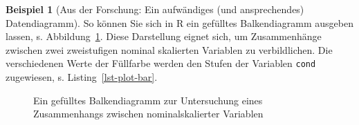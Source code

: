 \documentclass[
  a4paper,
]{scrbook}
\newenvironment{Shaded}{\begin{snugshade}}{\end{snugshade}}
\newcommand{\AttributeTok}[1]{\textcolor[rgb]{0.40,0.45,0.13}{#1}}
\newcommand{\CommentTok}[1]{\textcolor[rgb]{0.37,0.37,0.37}{#1}}
\newcommand{\FunctionTok}[1]{\textcolor[rgb]{0.28,0.35,0.67}{#1}}
\newcommand{\NormalTok}[1]{\textcolor[rgb]{0.00,0.23,0.31}{#1}}
\newcommand{\SpecialCharTok}[1]{\textcolor[rgb]{0.37,0.37,0.37}{#1}}
\newcommand{\StringTok}[1]{\textcolor[rgb]{0.13,0.47,0.30}{#1}}
\theoremstyle{definition}
\newtheorem{example}{Beispiel}[chapter]
\theoremstyle{definition}
\theoremstyle{definition}
\theoremstyle{remark}
\begin{document}
\begin{example}[Aus der Forschung: Ein aufwändiges (und ansprechendes)
Datendiagramm]
So können Sie sich in R ein gefülltes Balkendiagramm ausgeben lassen, s.
Abbildung~\ref{fig-de-bar-filled}. Diese Darstellung eignet sich, um
Zusammenhänge zwischen zwei zweistufigen nominal skalierten Variablen zu
verbildlichen. Die verschiedenen Werte der Füllfarbe werden den Stufen
der Variablen \texttt{cond} zugewiesen, s. Listing~\ref{lst-plot-bar}.

\begin{codelisting}

\caption{\label{lst-plot-bar}R-Syntax für ein gefülltes Balkendiagramm}

\centering{

\begin{Shaded}
\begin{Highlighting}[]
\NormalTok{mariokart }\SpecialCharTok{\%\textgreater{}\%} 
  \FunctionTok{select}\NormalTok{(cond, stock\_photo) }\SpecialCharTok{\%\textgreater{}\%} 
  \FunctionTok{plot\_bar}\NormalTok{(}\AttributeTok{by =} \StringTok{"cond"}\NormalTok{)  }\CommentTok{\# aus dem Paket DataExplorer}
\end{Highlighting}
\end{Shaded}

}

\end{codelisting}%

\begin{figure}[H]


\caption{\label{fig-de-bar-filled}Ein gefülltes Balkendiagramm zur
Untersuchung eines Zusammenhangs zwischen nominalskalierter Variablen}

\end{figure}%


\end{example}
\end{document}
